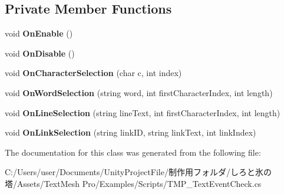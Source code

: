 \subsection*{Private Member Functions}
\begin{DoxyCompactItemize}
\item 
\mbox{\label{class_t_m_pro_1_1_examples_1_1_t_m_p___text_event_check_abd8a09e902fa87f209c97da3e27e249c}} 
void {\bfseries On\+Enable} ()
\item 
\mbox{\label{class_t_m_pro_1_1_examples_1_1_t_m_p___text_event_check_aa628289191f4e07be9227d6e6c1412ba}} 
void {\bfseries On\+Disable} ()
\item 
\mbox{\label{class_t_m_pro_1_1_examples_1_1_t_m_p___text_event_check_ae2c5dab169ac42313821c281473e2094}} 
void {\bfseries On\+Character\+Selection} (char c, int index)
\item 
\mbox{\label{class_t_m_pro_1_1_examples_1_1_t_m_p___text_event_check_a57df10d83c4ca2652de4d9d5b0c9abf7}} 
void {\bfseries On\+Word\+Selection} (string word, int first\+Character\+Index, int length)
\item 
\mbox{\label{class_t_m_pro_1_1_examples_1_1_t_m_p___text_event_check_a0fd5a44c55d48cc6897a98c3b4592f1a}} 
void {\bfseries On\+Line\+Selection} (string line\+Text, int first\+Character\+Index, int length)
\item 
\mbox{\label{class_t_m_pro_1_1_examples_1_1_t_m_p___text_event_check_aab97e6b0fc4aa8714c56dce297a6d847}} 
void {\bfseries On\+Link\+Selection} (string link\+ID, string link\+Text, int link\+Index)
\end{DoxyCompactItemize}


The documentation for this class was generated from the following file\+:\begin{DoxyCompactItemize}
\item 
C\+:/\+Users/user/\+Documents/\+Unity\+Project\+File/制作用フォルダ/しろと氷の塔/\+Assets/\+Text\+Mesh Pro/\+Examples/\+Scripts/T\+M\+P\+\_\+\+Text\+Event\+Check.\+cs\end{DoxyCompactItemize}
